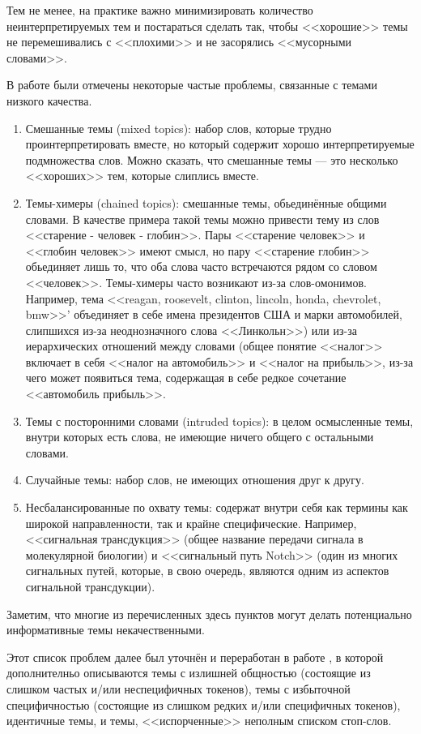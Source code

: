 Тем не менее, на практике важно минимизировать количество неинтерпретируемых тем и постараться сделать так, чтобы <<хорошие>> темы не перемешивались с <<плохими>> и не засорялись <<мусорными словами>>.

В работе \cite{mimno} были отмечены некоторые частые проблемы, связанные с темами низкого качества.
\begin{enumerate}
\item{Смешанные темы (mixed topics): набор слов, которые трудно проинтерпретировать вместе, но который содержит хорошо интерпретируемые подмножества слов. Можно сказать, что смешанные темы --- это несколько <<хороших>> тем, которые слиплись вместе.}
\item{Темы-химеры (chained topics): смешанные темы, обьединённые общими словами. В качестве примера такой темы можно привести тему из слов <<старение - человек - глобин>>. Пары <<старение человек>> и <<глобин человек>> имеют смысл, но пару <<старение глобин>> обьединяет лишь то, что оба слова часто встречаются рядом со словом <<человек>>. Темы-химеры часто возникают из-за слов-омонимов. Например, тема <<reagan, roosevelt, clinton, lincoln, honda, chevrolet, bmw>>' объединяет в себе имена президентов США и марки автомобилей, слипшихся из-за неоднозначного слова <<Линкольн>>) или из-за иерархических отношений между словами (общее понятие <<налог>> включает в себя <<налог на автомобиль>> и <<налог на прибыль>>, из-за чего может появиться тема, содержащая в себе редкое сочетание <<автомобиль прибыль>>.}
\item{Темы с посторонними словами (intruded topics): в целом осмысленные темы, внутри которых есть слова, не имеющие ничего общего с остальными словами.}
\item{Случайные темы: набор слов, не имеющих отношения друг к другу.}
\item{Несбалансированные по охвату темы: содержат внутри себя как термины как широкой направленности, так и крайне специфические. Например, <<сигнальная трансдукция>> (общее название передачи сигнала в молекулярной биологии) и <<сигнальный путь Notch>> (один из многих сигнальных путей, которые, в свою очередь, являются одним из аспектов сигнальной трансдукции).}
\end{enumerate}

Заметим, что многие из перечисленных здесь пунктов могут делать потенциально информативные темы некачественными.

Этот список проблем далее был уточнён и переработан в работе \cite{boydcare}, в которой дополнителньо описываются темы с излишней общностью (состоящие из слишком частых и/или неспецифичных токенов), темы с избыточной специфичностью (состоящие из слишком редких и/или специфичных токенов), идентичные темы, и темы, <<испорченные>> неполным списком стоп-слов.

